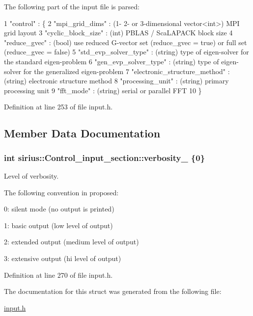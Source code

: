 The following part of the input file is parsed\+: 
\begin{DoxyCode}
1 "control" : \{
2   "mpi\_grid\_dims" : (1- 2- or 3-dimensional vector<int>) MPI grid layout
3   "cyclic\_block\_size" : (int) PBLAS / ScaLAPACK block size
4   "reduce\_gvec" : (bool) use reduced G-vector set (reduce\_gvec = true) or full set (reduce\_gvec = false)
5   "std\_evp\_solver\_type" : (string) type of eigen-solver for the standard eigen-problem
6   "gen\_evp\_solver\_type" : (string) type of eigen-solver for the generalized eigen-problem
7   "electronic\_structure\_method" : (string) electronic structure method
8   "processing\_unit" : (string) primary processing unit
9   "fft\_mode" : (string) serial or parallel FFT
10 \}
\end{DoxyCode}
 

Definition at line 253 of file input.\+h.



\subsection{Member Data Documentation}
\hypertarget{structsirius_1_1_control__input__section_ac378c6c686b420b511878d41905d493a}{}
\subsubsection[{verbosity\+\_\+}]{\setlength{\rightskip}{0pt plus 5cm}int sirius\+::\+Control\+\_\+input\+\_\+section\+::verbosity\+\_\+ \{0\}}\label{structsirius_1_1_control__input__section_ac378c6c686b420b511878d41905d493a}


Level of verbosity. 

The following convention in proposed\+:
\begin{DoxyItemize}
\item 0\+: silent mode (no output is printed) ~\newline

\item 1\+: basic output (low level of output) ~\newline

\item 2\+: extended output (medium level of output) ~\newline

\item 3\+: extensive output (hi level of output) 
\end{DoxyItemize}

Definition at line 270 of file input.\+h.



The documentation for this struct was generated from the following file\+:\begin{DoxyCompactItemize}
\item 
\hyperlink{input_8h}{input.\+h}\end{DoxyCompactItemize}
